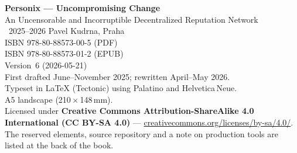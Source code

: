 \thispagestyle{empty}
\ifdefined\printmode\vspace*{\fill}\else{}\fi
\begin{flushleft}\small\sffamily
\textbf{Personix --- Uncompromising Change}\\[0.3em]
An Uncensorable and Incorruptible Decentralized Reputation Network\\[1.4em]

\textcopyright\ 2025--2026 Pavel Kudrna, Praha\\[0.4em]

ISBN 978-80-88573-00-5 (PDF)\\
ISBN 978-80-88573-01-2 (EPUB)\\[0.4em]

Version~6 (2026-05-21)\\
First drafted June--November 2025; rewritten April--May 2026.\\[1.4em]

Typeset in \LaTeX{} (Tectonic) using Palatino and Helvetica\,Neue.\\
A5 landscape (210\,$\times$\,148\,mm).\\[1.4em]

Licensed under \textbf{Creative Commons Attribution-ShareAlike 4.0
International (CC BY-SA 4.0)} ---
\href{https://creativecommons.org/licenses/by-sa/4.0/}{creativecommons.org/licenses/by-sa/4.0/}.
The reserved elements, source repository and a note on production tools
are listed at the back of the book.
\end{flushleft}
\ifdefined\printmode\else{}\fi
\clearpage
